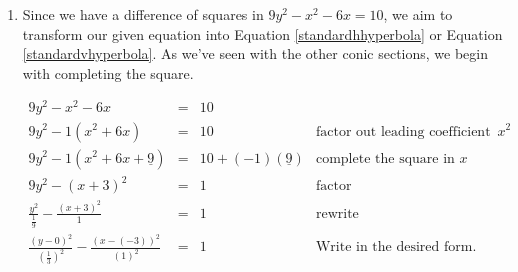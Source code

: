 \documentclass{ximera}
\begin{document}
\begin{example}
\begin{explanation}
\begin{enumerate}
\begin{enumerate}
\begin{center}
\end{center}

Since the $y^2$ term is being subtracted from the $x^2$ term, we are in the situation of Equation \ref{standardhhyperbola}. Hence,  the branches of the hyperbola open to the left and right so  the transverse axis lies along the $x$-axis and  the conjugate axis lies along the vertical line $x = 2$.  




Since the vertices of the hyperbola are where the hyperbola intersects the transverse axis, we get that the vertices are $(0,0)$ and $(4,0)$.  To find the foci, we need $c = \sqrt{a^2 + b^2} = \sqrt{4+25} = \sqrt{29}$.  Since the foci lie on the transverse axis, we move $\sqrt{29}$ units to the left and right of $(2,0)$ to arrive at $(2 - \sqrt{29},0)$ (approximately $(-3.39, 0)$) and $(2 + \sqrt{29}, 0)$ (approximately $(7.39, 0)$).  




Lastly, to determine the equations of the asymptotes, recall that the asymptotes pass through the center of the hyperbola, $(2,0)$, as well as the corners of guide rectangle.  As such,  they have slopes of $\pm \frac{b}{a} = \pm \frac{5}{2}$.  Feeding this information into  the point-slope equation of a line, Equation \ref{pointslope}, we get $y -0 = \pm \frac{5}{2} (x - 2)$, so the asymptotes are  $y = \frac{5}{2}x - 5$ and $y = -\frac{5}{2}x + 5$.  Putting it all together, we get our final graph below.

\begin{center}
\end{center}

\item  Since we have a difference of squares in $9y^2-x^2-6x=10$, we aim to transform our given equation into  Equation \ref{standardhhyperbola} or Equation \ref{standardvhyperbola}.  As we've seen with the other conic sections, we begin with completing the square.

\[ \begin{array}{rclr} 9y^2-x^2-6x & = & 10 & \\ 
9y^2-1\left(x^2+6x\right) &  = & 10 &  \text{factor out leading coefficient of $x^2$}  \\ 
9y^2-1 \left(x^2+6x + \underline{9}\right) &  = & 10 + (-1)\left( \underline{9} \right) & \text{complete the square in $x$}  \\ 
9y^2-(x+3)^2 &  = & 1 & \text{factor}   \\  
\frac{y^2}{\frac{1}{9}} - \frac{(x+3)^2}{1} & = & 1 & \text{rewrite} \\  
\frac{(y-0)^2}{\left(\frac{1}{3}\right)^2} - \frac{(x-(-3))^2}{(1)^2} & = & 1 & \text{Write in the desired form.}  \\
 \end{array} \]


\end{enumerate}
\end{enumerate}
\end{explanation}
\end{example}
\end{document}
